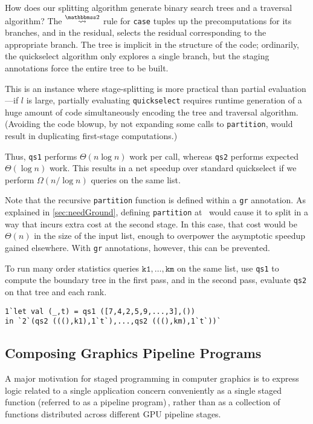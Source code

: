 How does our splitting algorithm generate binary search trees and a traversal
algorithm? The $\splittwosym$ rule for \texttt{case} tuples up the
precomputations for its branches, and in the residual, selects the residual
corresponding to the appropriate branch. The tree is implicit in the structure
of the code; ordinarily, the quickselect algorithm only explores a single
branch, but the staging annotations force the entire tree to be built.

This is an instance where stage-splitting is more practical than partial
evaluation---if $l$ is large, partially evaluating \texttt{quickselect} requires
runtime generation of a huge amount of code simultaneously encoding the tree and
traversal algorithm. (Avoiding the code blowup, by not expanding some calls to
\texttt{partition}, would result in duplicating first-stage computations.)

Thus, \texttt{qs1} performs $\Theta(n \log n)$ work per call, whereas
\texttt{qs2} performs expected $\Theta(\log n)$ work.  This results in a net
speedup over standard quickselect if we perform $\Omega(n / \log n)$ queries on
the same list. 

Note that the recursive \texttt{partition} function is defined within a \texttt{gr}
annotation.  As explained in \ref{sec:needGround}, defining \texttt{partition}
at \bbonem\ would cause it to split in a way that incurs extra cost at the second stage.
In this case, that cost would be $\Theta(n)$ in the size of the input list,
enough to overpower the asymptotic speedup gained elsewhere.
With \texttt{gr} annotations, however, this can be prevented.

To run many order statistics queries $\texttt{k1},\dots,\texttt{km}$ on the same
list, use \texttt{qs1} to compute the boundary tree in the first pass, and in
the second pass, evaluate \texttt{qs2} on that tree and each rank.
\begin{lstlisting}
1`let val (_,t) = qs1 ([7,4,2,5,9,...,3],())
in `2`(qs2 (((),k1),1`t`),...,qs2 (((),km),1`t`))`
\end{lstlisting}

\subsection {Composing Graphics Pipeline Programs}

A major motivation for staged programming in computer graphics is to express
logic related to a single application concern conveniently as a single staged
function (referred to as a pipeline program)\,\cite{Foley:2011}, rather than
as a collection of functions distributed across different GPU pipeline stages.  

